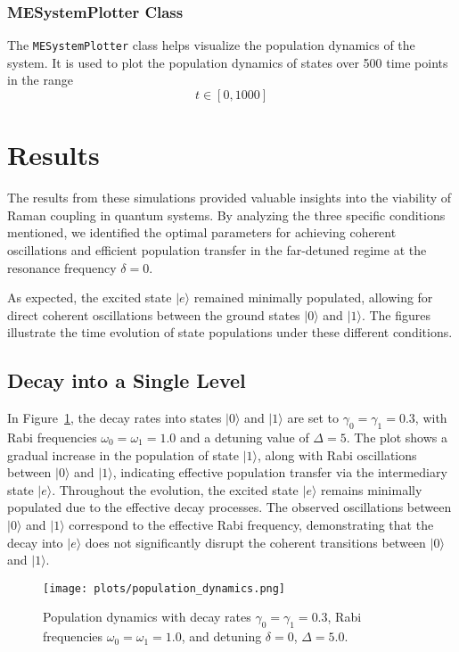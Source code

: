 \documentclass{article}
\begin{document}
\subsubsection{MESystemPlotter Class}

The \texttt{MESystemPlotter} class helps visualize the population dynamics of the system. It is used to plot the population dynamics of states over 500 time points in the range  \[ t \in [0, 1000] \]

\section{Results}

The results from these simulations provided valuable insights into the viability of Raman coupling in quantum systems. By analyzing the three specific conditions mentioned, we identified the optimal parameters for achieving coherent oscillations and efficient population transfer in the far-detuned regime at the resonance frequency \(\delta = 0\).

As expected, the excited state \(|e\rangle\) remained minimally populated, allowing for direct coherent oscillations between the ground states \(|0\rangle\) and \(|1\rangle\). The figures illustrate the time evolution of state populations under these different conditions.


\subsection{Decay into a Single Level}


In Figure~\ref{fig:pop_dyn1}, the decay rates into states \(|0\rangle\) and \(|1\rangle\) are set to \(\gamma_0 = \gamma_1 = 0.3\), with Rabi frequencies \(\omega_0 = \omega_1 = 1.0\) and a detuning value of \(\Delta = 5\). The plot shows a gradual increase in the population of state \(|1\rangle\), along with Rabi oscillations between \(|0\rangle\) and \(|1\rangle\), indicating effective population transfer via the intermediary state \(|e\rangle\). Throughout the evolution, the excited state \(|e\rangle\) remains minimally populated due to the effective decay processes. The observed oscillations between \(|0\rangle\) and \(|1\rangle\) correspond to the effective Rabi frequency, demonstrating that the decay into \(|e\rangle\) does not significantly disrupt the coherent transitions between \(|0\rangle\) and \(|1\rangle\).


\begin{figure}[h!]
    \centering
    \texttt{[image: plots/population\_dynamics.png]}
    \caption{Population dynamics with decay rates \(\gamma_0 = \gamma_1 = 0.3\), Rabi frequencies \(\omega_0 = \omega_1 = 1.0\), and detuning \(\delta = 0\), \(\Delta = 5.0\).}
    \label{fig:pop_dyn1}
\end{figure}
\end{document}
